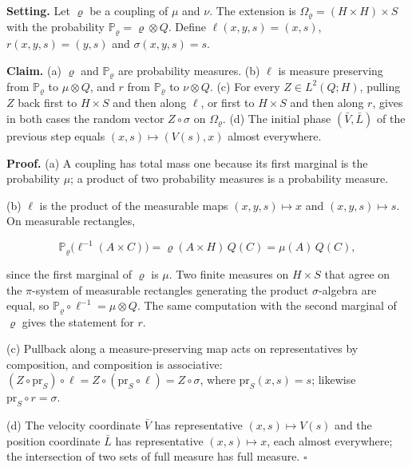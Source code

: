 \documentclass[11pt,a4paper]{article}
\begin{document}
\textbf{Setting.} Let \(\varrho\) be a coupling of \(\mu\) and \(\nu\). The extension is \(\Omega_\varrho=(H\times H)\times S\) with the probability \(\mathbb P_\varrho=\varrho\otimes Q\). Define \(\ell(x,y,s)=(x,s)\), \(r(x,y,s)=(y,s)\) and \(\sigma(x,y,s)=s\).




\textbf{Claim.} (a) \(\varrho\) and \(\mathbb P_\varrho\) are probability measures. (b) \(\ell\) is measure preserving from \(\mathbb P_\varrho\) to \(\mu\otimes Q\), and \(r\) from \(\mathbb P_\varrho\) to \(\nu\otimes Q\). (c) For every \(Z\in L^2(Q;H)\), pulling \(Z\) back first to \(H\times S\) and then along \(\ell\), or first to \(H\times S\) and then along \(r\), gives in both cases the random vector \(Z\circ\sigma\) on \(\Omega_\varrho\). (d) The initial phase \((\bar V,\bar L)\) of the previous step equals \((x,s)\mapsto(V(s),x)\) almost everywhere.




\textbf{Proof.} (a) A coupling has total mass one because its first marginal is the probability \(\mu\); a product of two probability measures is a probability measure.




(b) \(\ell\) is the product of the measurable maps \((x,y,s)\mapsto x\) and \((x,y,s)\mapsto s\). On measurable rectangles,


\[\mathbb P_\varrho\bigl(\ell^{-1}(A\times C)\bigr)=\varrho(A\times H)\,Q(C)=\mu(A)\,Q(C),\]


since the first marginal of \(\varrho\) is \(\mu\). Two finite measures on \(H\times S\) that agree on the \(\pi\)-system of measurable rectangles generating the product \(\sigma\)-algebra are equal, so \(\mathbb P_\varrho\circ\ell^{-1}=\mu\otimes Q\). The same computation with the second marginal of \(\varrho\) gives the statement for \(r\).




(c) Pullback along a measure-preserving map acts on representatives by composition, and composition is associative: \((Z\circ\mathrm{pr}_S)\circ\ell=Z\circ(\mathrm{pr}_S\circ\ell)=Z\circ\sigma\), where \(\mathrm{pr}_S(x,s)=s\); likewise \(\mathrm{pr}_S\circ r=\sigma\).




(d) The velocity coordinate \(\bar V\) has representative \((x,s)\mapsto V(s)\) and the position coordinate \(\bar L\) has representative \((x,s)\mapsto x\), each almost everywhere; the intersection of two sets of full measure has full measure. \(\square\)
\end{document}
